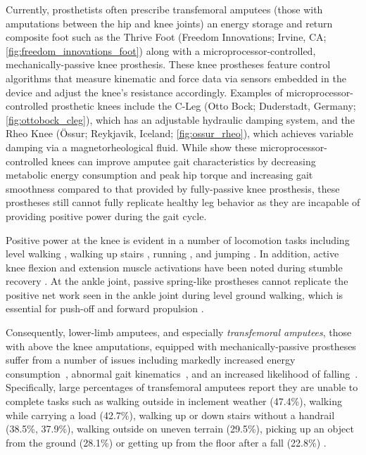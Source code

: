 Currently, prosthetists often prescribe transfemoral amputees (those with
amputations between the hip and knee joints) an energy storage and return
composite foot such as the Thrive Foot (Freedom Innovations; Irvine, CA;
\cref{fig:freedom_innovations_foot}) along with a microprocessor-controlled,
mechanically-passive knee prosthesis. These knee prostheses feature control
algorithms that measure kinematic and force data via sensors embedded in the
device and adjust the knee's resistance accordingly.  Examples of
microprocessor-controlled prosthetic knees include the C-Leg (Otto Bock;
Duderstadt, Germany; \cref{fig:ottobock_cleg}), which has an adjustable
hydraulic damping system, and the Rheo Knee (Össur; Reykjavik, Iceland;
\cref{fig:ossur_rheo}), which achieves variable damping via a magnetorheological
fluid. While \citet{johansson2005clinical} show these microprocessor-controlled
knees can improve amputee gait characteristics by decreasing metabolic energy
consumption and peak hip torque and increasing gait smoothness compared to that
provided by fully-passive knee prosthesis, these prostheses still cannot fully
replicate healthy leg behavior as they are incapable of providing positive power
during the gait cycle. 

Positive power at the knee is evident in a number of locomotion tasks including
level walking \citep{perry2010gait}, walking up stairs
\citep{nadeau2003frontal}, running \citep{buczek1990stance}, and jumping
\citep{hubley1983work}. In addition, active knee flexion and extension muscle
activations have been noted during stumble recovery \citep{eng1994strategies}.
At the ankle joint, passive spring-like prostheses cannot replicate the positive
net work seen in the ankle joint during level ground walking, which is essential
for push-off and forward propulsion \citep{perry2010gait}.

Consequently, lower-limb amputees, and especially \emph{transfemoral amputees},
those with above the knee amputations, equipped with mechanically-passive
prostheses suffer from a number of issues including markedly increased energy
consumption~\citep{waters1976energy}, abnormal gait
kinematics~\citep{jaegers1995prosthetic}, and an increased likelihood of
falling~\citep{miller2001prevalence}. Specifically, large percentages of
transfemoral amputees report they are unable to complete tasks such as walking
outside in inclement weather (47.4\%), walking while carrying a load (42.7\%),
walking up or down stairs without a handrail (38.5\%, 37.9\%), walking outside
on uneven terrain (29.5\%), picking up an object from the ground (28.1\%) or
getting up from the floor after a fall (22.8\%) \citep{gauthier1999enabling}.


